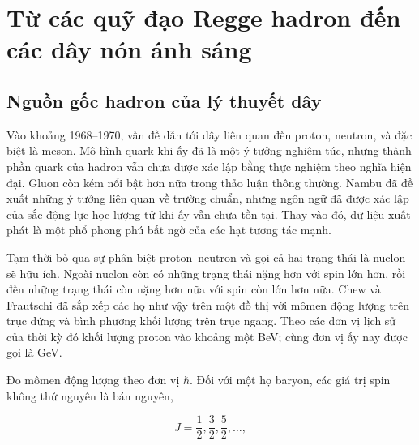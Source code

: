\chapter{Từ các quỹ đạo Regge hadron đến các dây nón ánh sáng}


\section{Nguồn gốc hadron của lý thuyết dây}

Vào khoảng 1968--1970, vấn đề dẫn tới dây liên quan đến proton,
neutron, và đặc biệt là meson. Mô hình quark khi ấy đã là một ý tưởng nghiêm túc,
nhưng thành phần quark của hadron vẫn chưa được xác lập bằng thực nghiệm
theo nghĩa hiện đại. Gluon còn kém nổi bật hơn nữa trong thảo luận thông thường.
Nambu đã đề xuất những ý tưởng liên quan về trường chuẩn, nhưng ngôn ngữ đã được xác lập
của sắc động lực học lượng tử khi ấy vẫn chưa tồn tại. Thay vào đó, dữ liệu xuất phát là
một phổ phong phú bất ngờ của các hạt tương tác mạnh.

Tạm thời bỏ qua sự phân biệt proton--neutron và gọi
cả hai trạng thái là nuclon sẽ hữu ích. Ngoài nuclon còn có những trạng thái nặng hơn với
spin lớn hơn, rồi đến những trạng thái còn nặng hơn nữa với spin còn lớn hơn nữa. Chew và
Frautschi đã sắp xếp các họ như vậy trên một đồ thị với mômen động lượng trên trục đứng
và bình phương khối lượng trên trục ngang. Theo các đơn vị lịch sử của thời kỳ đó
khối lượng proton vào khoảng một BeV; cùng đơn vị ấy nay được
gọi là GeV.

Đo mômen động lượng theo đơn vị \(\hbar\). Đối với một họ baryon, các
giá trị spin không thứ nguyên là bán nguyên,

\begin{equation}
  J=\frac12,\frac32,\frac52,\ldots,
\end{equation}

